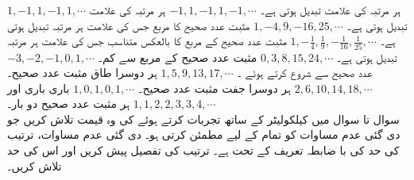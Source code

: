 $1,-1,1,-1,1,\cdots$\quad\quad
ہر مرتبہ   کی علامت تبدیل ہوتی ہے۔
$-1,1,-1,1,-1,\cdots$\quad\quad
ہر مرتبہ   کی علامت تبدیل ہوتی ہے۔
$1,-4,9,-16,25,\cdots$\quad\quad
مثبت عدد صحیح کا مربع جس کی علامت ہر مرتبہ تبدیل ہوتی ہے۔
$1,-\frac{1}{4},\frac{1}{9},-\frac{1}{16},\frac{1}{25},\cdots$\quad\quad
مثبت عدد صحیح کے مربع کا بالعکس متناسب جس کی علامت ہر  مرتبہ  تبدیل ہوتی ہے۔
$0,3,8,15,24,\cdots$\quad\quad
مثبت عدد صحیح کے مربع سے  کم۔
$-3,-2,-1,0,1,\cdots$\quad\quad
عدد صحیح  سے شروع کرتے ہوئے ۔
$1,5,9,13,17,\cdots$\quad\quad
ہر دوسرا طاق مثبت عدد صحیح۔
$2,6,10,14,18,\cdots$\quad\quad
ہر دوسرا جفت مثبت عدد صحیح۔
$1,0,1,0,1,\cdots$\quad\quad
باری باری  اور 
$1,1,2,2,3,3,4,\cdots$\quad\quad
ہر مثبت عدد صحیح دو بار۔
\\
سوال  تا سوال  میں کیلکولیٹر کے  ساتھ تجربات کرتے ہوئے  کی وہ قیمت تلاش کریں جو دی گئی عدم مساوات کو تمام  کے لیے مطمئن کرتی ہو۔ دی گئی عدم مساوات، ترتیب کی حد کی با ضابطہ تعریف کے تحت ہے۔ ترتیب کی تفصیل پیش کریں اور اس کی حد تلاش کریں۔

